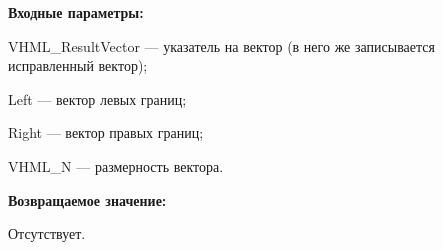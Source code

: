 \textbf{Входные параметры:}  
 
VHML\_ResultVector --- указатель на вектор (в него же записывается исправленный вектор);
 
Left --- вектор левых границ;
 
Right --- вектор правых границ;
 
VHML\_N --- размерность вектора.

\textbf{Возвращаемое значение:}

Отсутствует.